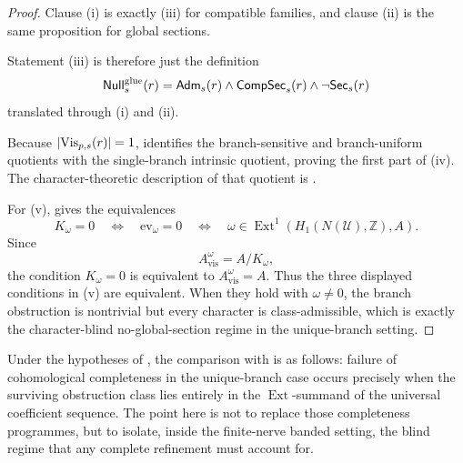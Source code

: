 \begin{proof}
Clause \textup{(i)} is exactly (iii) for compatible families, and clause \textup{(ii)} is the same proposition for global sections.

Statement \textup{(iii)} is therefore just the definition
\[
\mathsf{Null}^{\mathrm{glue}}_s(r)=\mathsf{Adm}_s(r)\land \mathsf{CompSec}_s(r)\land \neg \mathsf{Sec}_s(r)
\]
translated through \textup{(i)} and \textup{(ii)}.

Because $|\mathrm{Vis}_{p,s}(r)|=1$,  identifies the branch-sensitive and branch-uniform quotients with the single-branch intrinsic quotient, proving the first part of \textup{(iv)}. The character-theoretic description of that quotient is .

For \textup{(v)},  gives the equivalences
\[
K_{\omega}=0
\quad\Longleftrightarrow\quad
\mathrm{ev}_{\omega}=0
\quad\Longleftrightarrow\quad
\omega\in \operatorname{Ext}^1(H_1(N(\mathcal U),\mathbb Z),A).
\]
Since
\[
A_{\mathrm{vis}}^{\omega}=A/K_{\omega},
\]
the condition $K_{\omega}=0$ is equivalent to $A_{\mathrm{vis}}^{\omega}=A$. Thus the three displayed conditions in \textup{(v)} are equivalent. When they hold with $\omega\neq 0$, the branch obstruction is nontrivial but every character is class-admissible, which is exactly the character-blind no-global-section regime in the unique-branch setting.
\end{proof}

\begin{remark}\label{rem:caru-ext-residual}
Under the hypotheses of , the comparison with \cite{Caru2017,Caru2018,Montanhano2021} is as follows: failure of cohomological completeness in the unique-branch case occurs precisely when the surviving obstruction class lies entirely in the $\operatorname{Ext}$-summand of the universal coefficient sequence. The point here is not to replace those completeness programmes, but to isolate, inside the finite-nerve banded setting, the blind regime that any complete refinement must account for.
\end{remark}
